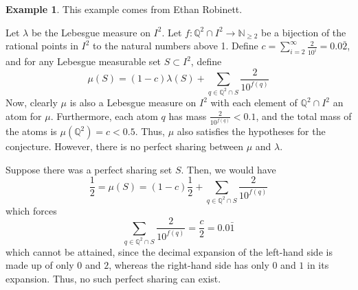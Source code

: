 \documentclass[12pt]{article}
\newcommand{\Q}{\mathbb{Q}}
\newcommand{\N}{\mathbb{N}}
\theoremstyle{definition}
\newtheorem{example}{Example}
\begin{document}
\begin{example}
    This example comes from Ethan Robinett.

    Let $\lambda$ be the Lebesgue measure on $I^2$. Let $f:\Q^2\cap
    I^2\to\N_{\geq 2}$ be a bijection of the rational points in $I^2$ to the
    natural numbers above 1. Define
    $c = \sum_{i=2}^{\infty}\frac{2}{10^i} = 0.0\bar{2}$, and for any Lebesgue
    measurable set $S\subset I^2$, define
    \[
        \mu(S) = (1-c)\lambda(S) + \sum_{q\in \Q^2\cap S}\frac{2}{10^{f(q)}}
    \]
    Now, clearly $\mu$ is also a Lebesgue measure on $I^2$ with each element of
    $\Q^2\cap I^2$ an atom for $\mu$. Furthermore, each atom $q$ has mass
    $\frac{2}{10^{f(q)}}<0.1$, and the total mass of the atoms is $\mu(\Q^2) =
    c < 0.5$. Thus, $\mu$ also satisfies the hypotheses for the conjecture.
    However, there is no perfect sharing between $\mu$ and $\lambda$.

    Suppose there was a perfect sharing set $S$. Then, we would have
    \[
        \frac{1}{2} = \mu(S) = (1-c)\frac{1}{2} + \sum_{q\in \Q^2\cap
        S}\frac{2}{10^{f(q)}}
    \]
    which forces
    \[
        \sum_{q\in\Q^2\cap S}\frac{2}{10^{f(q)}} = \frac{c}{2} = 0.0\bar{1}
    \]
    which cannot be attained, since the decimal expansion of the left-hand side
    is made up of only $0$ and $2$, whereas the right-hand side has only $0$ and
    $1$ in its expansion. Thus, no such perfect sharing can exist.
\end{example}
\end{document}
